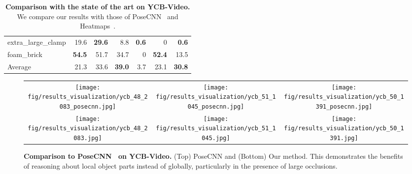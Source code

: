 \documentclass[10pt,twocolumn,letterpaper]{article}
\begin{document}
\begin{table}
{\begin{tabular}{lrrr!{\vrule width 1pt}rrr}
{\small extra\_large\_clamp} & 19.6 & {\bf 29.6} & 8.8 & {\bf 0.6} & 0 & {\bf 0.6} \\
{\small foam\_brick} & {\bf 54.5} & 51.7 & 34.7 & 0 & {\bf 52.4} & 13.5 \\
		\midrule
		Average		& 21.3	&	33.6	&	{\bf 39.0}	& 3.7	& 23.1	& {\bf 30.8} \\
		\bottomrule
	\end{tabular}
}
	\vspace{-3mm}
	\caption{{\bf Comparison with the state of the art on YCB-Video.} We compare our results with those of PoseCNN~\cite{Xiang18b} and Heatmaps~\cite{Oberweger18}.}
	\label{tab:ycbvideo_eval}
\end{table} 
 
 

\begin{figure*}[htbp]
	\centering
	\begin{tabular}{ccc}
	\texttt{[image: fig/results\_visualization/ycb\_48\_2083\_posecnn.jpg]}&
	\texttt{[image: fig/results\_visualization/ycb\_51\_1045\_posecnn.jpg]}&
	\texttt{[image: fig/results\_visualization/ycb\_50\_1391\_posecnn.jpg]}\\
	\texttt{[image: fig/results\_visualization/ycb\_48\_2083.jpg]}&
	\texttt{[image: fig/results\_visualization/ycb\_51\_1045.jpg]}&
	\texttt{[image: fig/results\_visualization/ycb\_50\_1391.jpg]}
	\end{tabular}
	\vspace{-2mm}
	\caption{{\bf Comparison to PoseCNN~\cite{Xiang18b} on YCB-Video.} (Top) PoseCNN and (Bottom) Our method. This demonstrates the benefits of reasoning about local object parts instead of globally, particularly in the presence of large occlusions.}
	\label{fig:results_visualization_ycb}
\end{figure*} 
 
\end{document}
